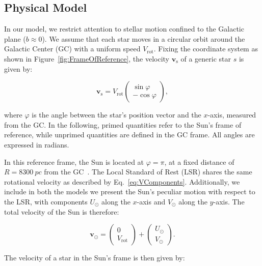 \subsection{Physical Model}\label{subsec:PhysicalModel}

In our model, we restrict attention to stellar motion confined to the Galactic plane ($b \approx 0$). We assume that each star moves in a circular orbit around the Galactic Center (GC) with a uniform speed $V_{\text{rot}}$. Fixing the coordinate system as shown in Figure~\ref{fig:FrameOfReference}, the velocity $\bm{v}_{\text{s}}$ of a generic star $s$ is given by:

\begin{equation}\label{eq:VComponents}
    \bm{v}_{\text{s}} = V_{\text{rot}} \begin{pmatrix} \sin\varphi \\ -\cos\varphi \end{pmatrix},
\end{equation}

\noindent
where $\varphi$ is the angle between the star’s position vector and the $x$-axis, measured from the GC. In the following, primed quantities refer to the Sun's frame of reference, while unprimed quantities are defined in the GC frame. All angles are expressed in radians.



In this reference frame, the Sun is located at $\varphi = \pi$, at a fixed distance of $R = \qty{8300}{pc}$ from the GC~\cite{GalacticKinematics}. The Local Standard of Rest (LSR) shares the same rotational velocity as described by Eq.~\ref{eq:VComponents}. Additionally, we include in both the models we present the Sun's peculiar motion with respect to the LSR, with components $U_{\odot}$ along the $x$-axis and $V_{\odot}$ along the $y$-axis. The total velocity of the Sun is therefore:

\begin{equation}\label{eq:VSun}
    \bm{v}_{\odot} = \begin{pmatrix} 0 \\ V_{\text{rot}} \end{pmatrix} + \begin{pmatrix} U_{\odot} \\ V_{\odot} \end{pmatrix}.
\end{equation}

The velocity of a star in the Sun's frame is then given by:

